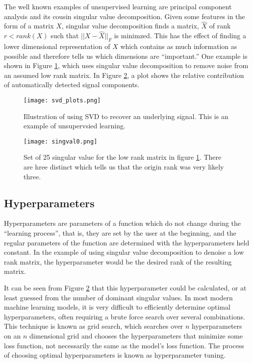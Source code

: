 The well known examples of unsupervised learning are principal component analysis and its cousin singular value decomposition.  Given some features in the form of a matrix $X$, singular value decomposition finds a matrix, $\hat{X}$ of rank $r < rank(X)$ such that $||X-\hat{X}||_F$ is minimzed.  This has the effect of finding a lower dimensional representation of $X$ which contains as much information as possible and therefore tells us which dimensions are ``important.''  One example is shown in Figure \ref{fig:svd_recover}, which uses singular value decomposition to remove noise from an assumed low rank matrix.  In Figure \ref{fig:singval_good}, a plot shows the relative contribution of automatically detected signal components.  

\begin{figure}
    \centering
    \texttt{[image: svd\_plots.png]}
    \caption{Illustration of using SVD to recover an underlying signal.  This is an example of unsupervsied learning.}
    \label{fig:svd_recover}
\end{figure}
\begin{figure}
    \centering
    \texttt{[image: singval0.png]}
    \caption{Set of 25 singular value for the low rank matrix in figure \ref{fig:svd_recover}.  There are hree distinct which tells us that the origin rank was very likely three.}
    \label{fig:singval_good}
\end{figure}

\subsection{Hyperparameters} \label{sec:hyperparameters}
Hyperparameters are parameters of a function which do not change during the ``learning process'', that is, they are set by the user at the beginning, and the regular parameters of the function are determined with the hyperparameters held constant.  In the example of using singular value decomposition to denoise a low rank matrix, the hyperparameter would be the desired rank of the resulting matrix.  

It can be seen from Figure \ref{fig:singval_good} that this hyperparameter could be calculated, or at least guessed from the number of dominant singular values.  In most modern machine learning models, it is very difficult to efficiently determine optimal hyperparameters, often requiring a brute force search over several combinations.  This technique is known as grid search, which searches over $n$ hyperparameters on an $n$ dimensional grid and chooses the hyperparameters that minimize some loss function, not necessarily the same as the model's loss function.  The process of choosing optimal hyperparameters is known as hyperparameter tuning.


